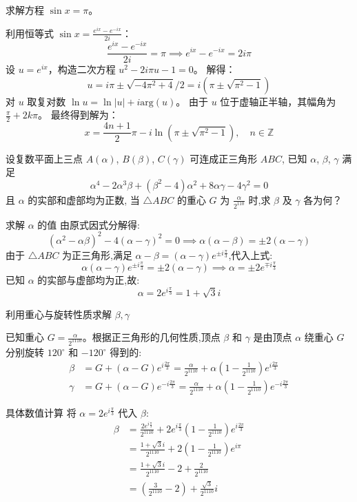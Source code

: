\begin{questions}
    \question 求解方程 $\sin x = \pi$。
\begin{solution}
利用恒等式 $\sin x = \frac{e^{ix} - e^{-ix}}{2i}$：
\[ \frac{e^{ix} - e^{-ix}}{2i} = \pi \implies e^{ix} - e^{-ix} = 2i\pi \]
设 $u = e^{ix}$，构造二次方程 $u^2 - 2i\pi u - 1 = 0$。
解得：
\[ u = i\pi \pm \sqrt{-4\pi^2 + 4} / 2 = i(\pi \pm \sqrt{\pi^2 - 1}) \]
对 $u$ 取复对数 $\ln u = \ln |u| + i\text{arg}(u)$。
由于 $u$ 位于虚轴正半轴，其幅角为 $\frac{\pi}{2} + 2k\pi$。
最终得到解为：
\[ x = \frac{4n+1}{2}\pi - i \ln(\pi \pm \sqrt{\pi^2 - 1}), \quad n \in \mathbb{Z} \]
\end{solution}

    \question 设复数平面上三点 $A(\alpha)$, $B(\beta)$, $C(\gamma)$ 可连成正三角形 $ABC$,  
已知 $\alpha$, $\beta$, $\gamma$ 满足
\[
\alpha^4 - 2\alpha^3\beta + (\beta^2 - 4)\alpha^2 + 8\alpha\gamma - 4\gamma^2 = 0
\]
且 $\alpha$ 的实部和虚部均为正数,  
当 $\triangle ABC$ 的重心 $G$ 为 $\frac{\alpha}{2^{110}}$ 时,求 $\beta$ 及 $\gamma$ 各为何？
\begin{solution}
求解 $\alpha$ 的值
由原式因式分解得:
\[ (\alpha^2 - \alpha\beta)^2 - 4(\alpha - \gamma)^2 = 0 \implies \alpha(\alpha - \beta) = \pm 2(\alpha - \gamma) \]
由于 $\triangle ABC$ 为正三角形,满足 $\alpha - \beta = (\alpha - \gamma)e^{\pm i\frac{\pi}{3}}$,代入上式:
\[ \alpha (\alpha - \gamma) e^{\pm i\frac{\pi}{3}} = \pm 2(\alpha - \gamma) \implies \alpha = \pm 2 e^{\mp i\frac{\pi}{3}} \]
已知 $\alpha$ 的实部与虚部均为正,故:
\[ \alpha = 2e^{i\frac{\pi}{3}} = 1 + \sqrt{3}i \]

利用重心与旋转性质求解 $\beta, \gamma$

已知重心 $G = \frac{\alpha}{2^{1110}}$。根据正三角形的几何性质,顶点 $\beta$ 和 $\gamma$ 是由顶点 $\alpha$ 绕重心 $G$ 分别旋转 $120^\circ$ 和 $-120^\circ$ 得到的:
\begin{align*}
\beta &= G + (\alpha - G)e^{i\frac{2\pi}{3}} = \frac{\alpha}{2^{1110}} + \alpha\left(1 - \frac{1}{2^{1110}}\right)e^{i\frac{2\pi}{3}} \\
\gamma &= G + (\alpha - G)e^{-i\frac{2\pi}{3}} = \frac{\alpha}{2^{1110}} + \alpha\left(1 - \frac{1}{2^{1110}}\right)e^{-i\frac{2\pi}{3}}
\end{align*}

具体数值计算
将 $\alpha = 2e^{i\frac{\pi}{3}}$ 代入 $\beta$:
\begin{align*}
\beta &= \frac{2e^{i\frac{\pi}{3}}}{2^{1110}} + 2e^{i\frac{\pi}{3}}\left(1 - \frac{1}{2^{1110}}\right)e^{i\frac{2\pi}{3}} \\
&= \frac{1 + \sqrt{3}i}{2^{1110}} + 2\left(1 - \frac{1}{2^{1110}}\right)e^{i\pi} \\
&= \frac{1 + \sqrt{3}i}{2^{1110}} - 2 + \frac{2}{2^{1110}} \\
&= \left( \frac{3}{2^{1110}} - 2 \right) + \frac{\sqrt{3}}{2^{1110}}i
\end{align*}


\end{solution}
\end{questions}
